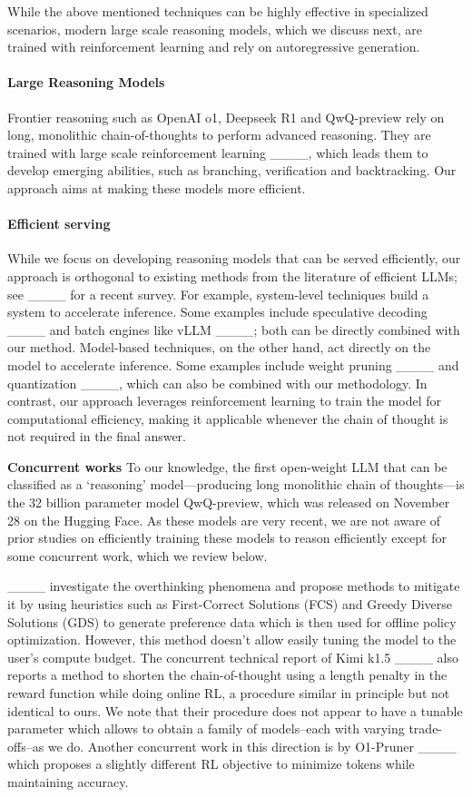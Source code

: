 While the above mentioned techniques 
can be highly effective in specialized scenarios, 
modern large scale reasoning models, which we discuss next,
are trained with reinforcement learning and rely on autoregressive generation. 

\paragraph{Large Reasoning Models}
Frontier reasoning such as OpenAI o1, Deepseek R1 and QwQ-preview rely on long, monolithic chain-of-thoughts to perform advanced reasoning.   
They are trained with large scale reinforcement learning ____, which leads them to develop emerging abilities, such as branching, verification and backtracking. 
Our approach aims at making these models more efficient.
\vspace{-0.7em}
\paragraph{Efficient serving}
While we focus on developing reasoning models that can be served efficiently, our approach is orthogonal to existing methods from the literature of efficient LLMs; see ____ for a recent survey. 
For example, system-level techniques
build a system to accelerate inference. Some examples include speculative decoding ____ and batch engines like vLLM ____; both can be directly combined with our method. Model-based techniques, on the other hand, act directly on the model to accelerate inference. Some examples include weight pruning ____ and quantization ____, which can also be combined with our methodology.
In contrast, our approach leverages reinforcement learning to train the model for computational efficiency, making it applicable whenever the chain of thought is not required in the final answer.

\textbf{Concurrent works}
To our knowledge, 
the first open-weight LLM that can be classified as a `reasoning' model---producing long monolithic chain of thoughts---is the 32 billion parameter model QwQ-preview, which was released on November 28 on the Hugging Face.
As these models are very recent, we are not aware of prior studies on efficiently training these models to reason efficiently except for some concurrent work, which we review below.

____ investigate the overthinking phenomena and propose methods to mitigate it by using heuristics such as First-Correct Solutions (FCS) and Greedy Diverse Solutions (GDS) to generate preference data which is then used for offline policy optimization. However, this method doesn't allow easily tuning the model to the user's compute budget. 
The concurrent technical report of Kimi k1.5 ____ also reports a method to shorten the chain-of-thought using a length penalty in the reward function while doing online RL, a procedure similar in principle but not identical to ours.
We note that their procedure does not appear to have a tunable parameter which allows to obtain a family of models--each with varying trade-offs--as we do. Another concurrent work in this direction is by O1-Pruner ____ which proposes a slightly different RL objective to minimize tokens while maintaining accuracy. 

